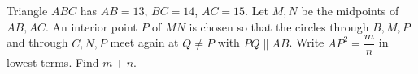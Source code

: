 Triangle $ABC$ has $AB=13$, $BC=14$, $AC=15$. Let $M,N$ be the midpoints of $AB,AC$. An interior point $P$ of $MN$ is chosen so that the circles through $B,M,P$ and through $C,N,P$ meet again at $Q\ne P$ with $PQ\parallel AB$. Write $AP^2=\dfrac{m}{n}$ in lowest terms. Find $m+n$.
